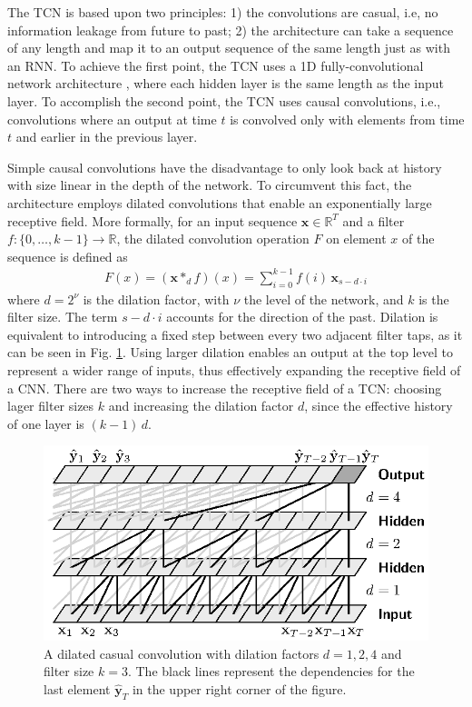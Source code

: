 \documentclass{scrartcl}
\begin{document}
The TCN is based upon two principles: 1) the convolutions are casual, i.e, no information leakage from future to past; 2) the architecture can take a sequence of any length and map it to an output sequence of the same length just as with an RNN. To achieve the first point, the TCN uses a 1D fully-convolutional network architecture \cite{Long2015}, where each hidden layer is the same length as the input layer. To accomplish the second point, the TCN uses causal convolutions, i.e., convolutions where an output at time $t$ is convolved only with elements from time $t$ and earlier in the previous layer.

Simple causal convolutions have the disadvantage to only look back at history with size linear in the depth of the network. To circumvent this fact, the architecture employs dilated convolutions that enable an exponentially large receptive field. More formally, for an input sequence $\mathbf x \in \mathbb R^T$ and a filter $f:\{ 0, \dots, k-1\} \rightarrow \mathbb R$, the dilated convolution operation $F$ on element $x$ of the sequence is defined as
\begin{align}
F(x) = (\mathbf x *_d f)(x) = \sum_{i=0}^{k-1} f(i) \, \mathbf x_{s-d\cdot i}
\end{align}
where $d = 2^\nu$ is the dilation factor, with $\nu$ the level of the network, and $k$ is the filter size. The term $s-d\cdot i$ accounts for the direction of the past. Dilation is equivalent to introducing a fixed  step between every two adjacent filter taps, as it can be seen in Fig. \ref{fig:dilated_convolutions}. Using larger dilation enables an output at the top level to represent a wider range of inputs, thus effectively expanding the receptive field of a CNN. There are two ways to increase the receptive field of a TCN: choosing lager filter sizes $k$ and increasing the dilation factor $d$, since the effective history of one layer is $(k-1) \, d$. 

\begin{figure}[htbp]
\centering
\includegraphics[scale=1]{figures/dilated_conv.eps}
\caption{A dilated casual convolution with dilation factors $d = 1,2,4$ and filter size $k=3$. The black lines represent the dependencies for the last element $\hat{\mathbf y}_T$ in the upper right corner of the figure.}
\label{fig:dilated_convolutions} 
\end{figure}
\end{document}

